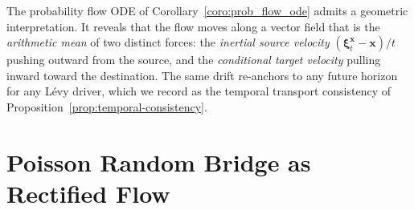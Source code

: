 \documentclass{article}
\newcommand{\levy}{{L\'evy }}
\theoremstyle{definition}
\begin{document}
The probability flow ODE of Corollary~\ref{coro:prob_flow_ode} admits a geometric interpretation. It reveals that the flow moves along a vector field that is the \emph{arithmetic mean} of two distinct forces: the \textit{inertial source velocity} $(\boldsymbol{\xi}^{\boldsymbol{x}}_t - \boldsymbol{x})/t$ pushing outward from the source, and the \textit{conditional target velocity} pulling inward toward the destination. The same drift re-anchors to any future horizon for any \levy driver, which we record as the temporal transport consistency of Proposition~\ref{prop:temporal-consistency}.

\section{Poisson Random Bridge as Rectified Flow}\label{sec:poisson}
\end{document}
